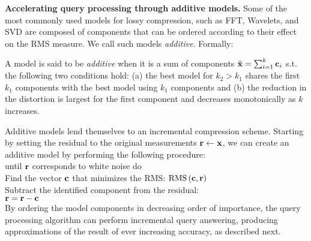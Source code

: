 
{\bf Accelerating query processing through additive models.}
Some of the most commonly used models for lossy compression, such as FFT, Wavelets, and SVD are composed of components that can be ordered according to their effect on the RMS measure. We call such models \emph{additive}. Formally:

\begin{defin}
A model is said to be \emph{additive} when it is a sum of components $\hat{\mathbf{x}} =
\sum_{i=1}^k \mathbf{c}_i$ s.t. the following two conditions hold: (a) the best model for $k_2>k_1$ shares the first $k_1$ components with the best model using $k_1$ components and
(b) the reduction in the distortion is largest for the first component and decreases monotonically as $k$ increases.
\end{defin}


Additive models lend themselves to an incremental compression scheme. Starting by setting the residual to the original measurements $\mathbf{r} \leftarrow \mathbf{x}$, we can create an additive model by performing the following procedure:\\

\noindent until $\mathbf{r}$ corresponds to white noise do\\
\noindent\hspace*{0.5cm} Find the vector $\mathbf{c}$ that minimizes the RMS: 
$\mbox{RMS}\left(\mathbf{c},\mathbf{r} \right)$\\
\noindent\hspace*{0.5cm} Subtract the identified component from the residual:\\
\noindent\hspace*{1cm}$\mathbf{r} = \mathbf{r} - \mathbf{c}$\\

By ordering the model components in decreasing order of importance, the query processing algorithm can perform incremental query answering, producing approximations of the result of ever increasing accuracy, as described next.

